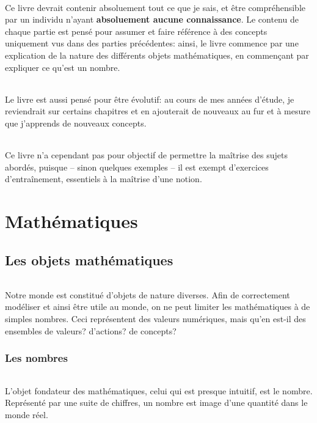 \documentclass[a4paper]{book}
\begin{document}
    \paragraph{}
    Ce livre devrait contenir absoluement tout ce que je sais, et être compréhensible par un individu n'ayant \textbf{absoluement aucune connaissance}. Le contenu de chaque partie est pensé pour assumer et faire référence à des concepts uniquement vus dans des parties précédentes: ainsi, le livre commence par une explication de la nature des différents objets mathématiques, en commençant par expliquer ce qu'est un nombre.
    \paragraph{}
    Le livre est aussi pensé pour être évolutif: au cours de mes années d'étude, je reviendrait sur certains chapitres et en ajouterait de nouveaux au fur et à mesure que j'apprends de nouveaux concepts.
    \paragraph{}
    Ce livre n'a cependant pas pour objectif de permettre la maîtrise des sujets abordés, puisque -- sinon quelques exemples -- il est exempt d'exercices d'entraînement, essentiels à la maîtrise d'une notion.
 
    \mainmatter
 
    \part{Mathématiques}
    \chapter{Les objets mathématiques}
    \paragraph{}
    Notre monde est constitué d'objets de nature diverses. Afin de correctement modéliser et ainsi être utile au monde, on ne peut limiter les mathématiques à de simples nombres. Ceci représentent des valeurs numériques, mais qu'en est-il des ensembles de valeurs? d'actions? de concepts?
    \section{Les nombres}
    \paragraph{}
    L'objet fondateur des mathématiques, celui qui est presque intuitif, est le nombre. Représenté par une suite de chiffres, un nombre est image d'une quantité dans le monde réel.
\end{document}
